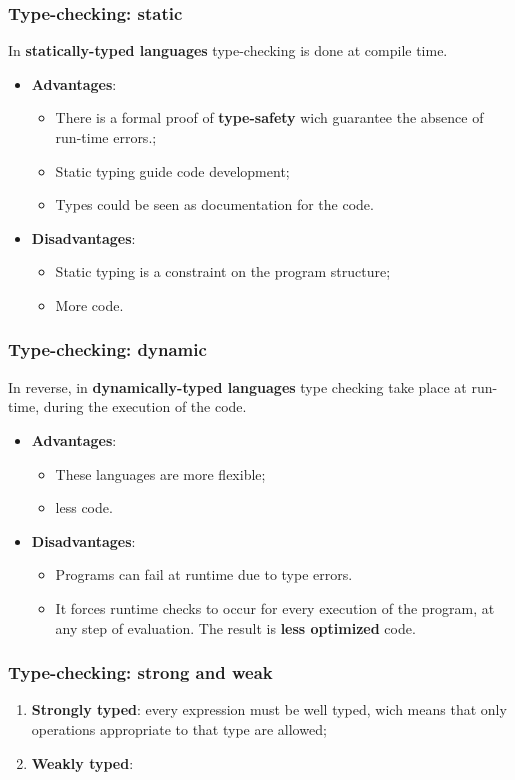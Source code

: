 \documentclass[xcolor ={table,usenames,dvipsnames}]{beamer}
\theoremstyle{definition}
\begin{document}
	\begin{frame}
		\frametitle{Type-checking: static  }
		In \textbf{statically-typed languages} type-checking is done at compile time.
		\begin{itemize}
			\item \textbf{Advantages}:\begin{itemize}
				\item There is a formal proof of \textbf{type-safety} wich guarantee the absence of run-time errors.;
				\item Static typing guide code development;
				\item Types could be seen as documentation for the code.
			\end{itemize}
			\item \textbf{Disadvantages}: 
			\begin{itemize}
				\item Static typing is a constraint on the program structure;
				\item More code.
			\end{itemize}
		\end{itemize}
	\end{frame}

\begin{frame}
	\frametitle{Type-checking: dynamic}
	In reverse, in \textbf{dynamically-typed languages}
	type checking take place at run-time, during the execution of the code.
	\begin{itemize}
		\item \textbf{Advantages}:
		\begin{itemize}
			\item These languages are more flexible;
			\item less code.
		\end{itemize}
		\item \textbf{Disadvantages}:
		\begin{itemize}
			\item Programs can fail at runtime due to type errors.
			\item It forces runtime checks to occur for every execution of the program, at any step of evaluation. The result is \textbf{less optimized} code.
		\end{itemize}
	\end{itemize}
 \end{frame}

\begin{frame}
	\frametitle{Type-checking: strong and weak}
	\begin{enumerate}
		\item \textbf{Strongly typed}: every expression must be well typed, wich means that only operations appropriate to that type are allowed;
		\item \textbf{Weakly typed}:
	\end{enumerate}
	
\end{frame}
\end{document}
